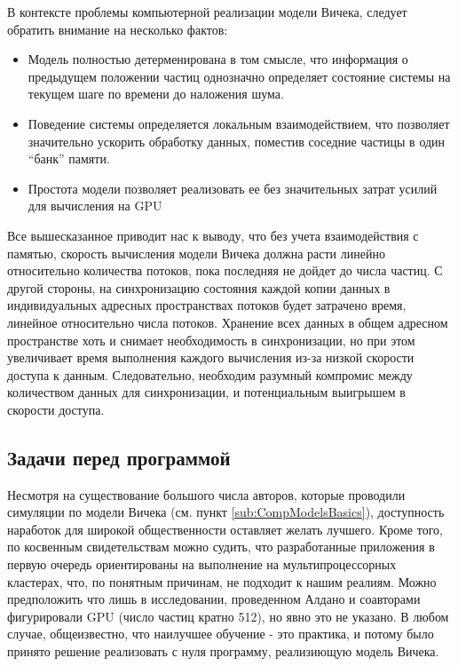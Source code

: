         В контексте проблемы компьютерной реализации модели Вичека, следует обратить внимание на несколько фактов:
        \begin{itemize}
            \item Модель полностью детерменирована в том смысле, что информация о предыдущем положении частиц однозначно определяет состояние системы на текущем шаге по времени до наложения шума.
            \item Поведение системы определяется локальным взаимодействием, что позволяет значительно ускорить обработку данных, поместив соседние частицы в один ``банк'' памяти.
            \item Простота модели позволяет реализовать ее без значительных затрат усилий для вычисления на GPU
        \end{itemize}
        Все вышесказанное приводит нас к выводу, что без учета взаимодействия с памятью, скорость вычисления модели Вичека должна расти линейно относительно количества потоков, пока последняя не дойдет до числа частиц. С другой стороны, на синхронизацию состояния каждой копии данных в индивидуальных адресных пространствах потоков будет затрачено время, линейное относительно числа потоков. Хранение всех данных в общем адресном пространстве хоть и снимает необходимость в синхронизации, но при этом увеличивает время выполнения каждого вычисления из-за низкой скорости доступа к данным. Следовательно, необходим разумный компромис между количеством данных для синхронизации, и потенциальным выигрышем в скорости доступа.


    \subsection{Задачи перед программой} %
    \label{sub:TaksForProgramm}
        Несмотря на существование большого числа авторов, которые проводили симуляции по модели Вичека (см. пункт \ref{sub:CompModelsBasics}), доступность наработок для широкой общественности оставляет желать лучшего. Кроме того, по косвенным свидетельствам можно судить, что разработанные приложения в первую очередь ориентированы на выполнение на мультипроцессорных кластерах, что, по понятным причинам, не подходит к нашим реалиям. Можно предположить что лишь в исследовании, проведенном Алдано и соавторами \cite{baglietto2008,aldana2009} фигурировали GPU (число частиц кратно 512), но явно это не указано. В любом случае, общеизвестно, что наилучшее обучение - это практика, и потому было принято решение реализовать с нуля программу, реализиющую модель Вичека.


